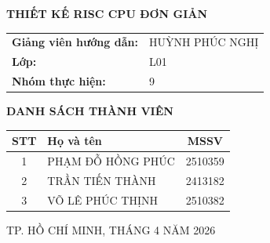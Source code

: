 \begin{titlepage}
\begin{center}
        \vspace{0.4cm}
        \vspace{0.4cm}
        
        {\fontsize{22}{26}\selectfont \textbf{THIẾT KẾ RISC CPU ĐƠN GIẢN} \par}
        
        \vspace{0.4cm}
    \end{center}
    
    \vspace{1cm}
    
    
    \begin{center}
        \renewcommand{\arraystretch}{1.5}
        \begin{tabular}{l l}
            \textbf{Giảng viên hướng dẫn:} & HUỲNH PHÚC NGHỊ \\
            \textbf{Lớp:}                  & L01 \\
            \textbf{Nhóm thực hiện:}       & 9 \\
        \end{tabular}
    \end{center}
    
    \vfill
    
    \begin{center}
        \textbf{DANH SÁCH THÀNH VIÊN} \\
        \vspace{0.3cm}
        \renewcommand{\arraystretch}{1.2}
        \begin{tabular}{|c|l|c|}
            \hline
            \textbf{STT} & \textbf{Họ và tên} & \textbf{MSSV} \\ \hline
            1 & PHẠM ĐỖ HỒNG PHÚC & 2510359 \\ \hline
            2 & TRẦN TIẾN THÀNH & 2413182 \\ \hline
            3 & VÕ LÊ PHÚC THỊNH & 2510382 \\ \hline
        \end{tabular}
    \end{center}

    \vfill 
    
    \begin{center}
        {\fontsize{13}{15}\selectfont TP. HỒ CHÍ MINH, THÁNG 4 NĂM 2026}
    \end{center}

\end{titlepage}